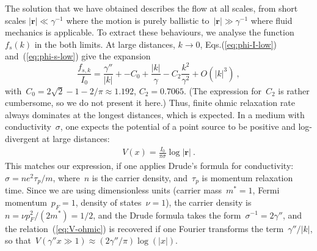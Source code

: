 \documentclass[preprint,aps,eqsecnum, prb]{revtex4-1}
\begin{document}
The solution that we have obtained describes the flow at all scales,
from short scales $|{\bm r}| \ll \gamma^{-1}$ where the motion is
purely ballistic to~$|{\bm r}| \gg \gamma^{-1}$ where fluid mechanics
is applicable. To extract these behaviours, we analyse
the function~$f_s(k)$ in the both limits.
At large distances, $k\to 0$,
Eqs.(\ref{eq:phi-I-low}) and~(\ref{eq:phi-s-low}) give
the expansion
\begin{equation}
  \label{eq:fs-k=0}
  \frac{f_{s, k}}{I_0}
  = \frac{\gamma''}{|k|} +
  - C_0
  + \frac{|k|}{\gamma}
  - C_2
  \frac{k^2}{\gamma^2} + O(|k|^3)
  \ ,
\end{equation}
with~$C_0 = 2\sqrt{2} - 1 - 2/\pi \approx 1.192$,
$C_2 = 0.7065$. (The expression for~$C_2$ is rather cumbersome,
so we do not present it here.)
Thus, finite ohmic relaxation rate
always dominates at the longest
distances, which is expected. In a medium with conductivity~$\sigma$,
one expects the potential of a point source to be positive and log-divergent
at large distances:
\begin{align}
  \label{eq:V-ohmic}
  V(x) = \frac{I_0}{\pi \sigma} \log |{\bm r}|\ .
\end{align}
This matches our expression, if one applies Drude's formula
for conductivity: $\sigma = ne^2 \tau_p/m$, where~$n$ is the carrier
density, and~$\tau_p$ is momentum relaxation time.
Since we are using dimensionless units (carrier mass~$m^\ast = 1$,
Fermi momentum~$p_F = 1$, density of states~$\nu = 1$),
the carrier density is~$n = \nu p_F^2 / (2m^\ast) = 1/2$,
and the Drude formula takes the form~$\sigma^{-1} = 2 \gamma''$,
and the relation~(\ref{eq:V-ohmic}) is recovered if
one Fourier transforms the term~$\gamma'' / |k|$,
so that~$V(\gamma'' x \gg 1) \approx (2\gamma''/\pi) \log(|x|)$.
\end{document}
